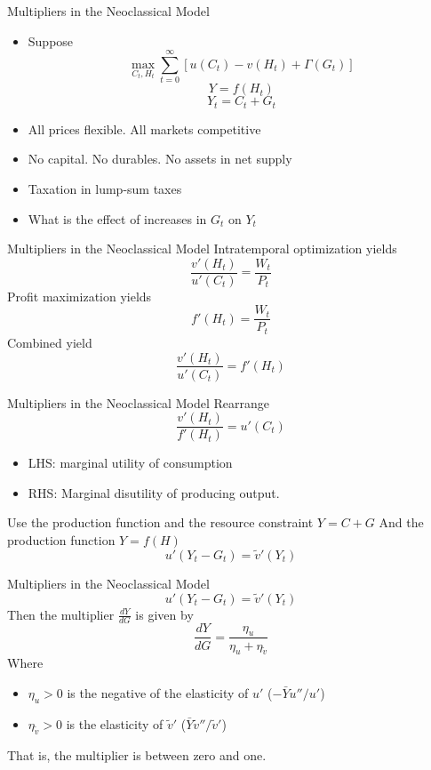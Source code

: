 \documentclass[english,xcolor=svgnames]{beamer}
\begin{document}
\begin{frame}{Multipliers in the Neoclassical Model}
\begin{itemize}
\item Suppose
$$\max_{C_t,H_t} \sum_{t=0}^{\infty} \left[u(C_t) - v(H_t) + \Gamma(G_t)\right]$$
\vspace{-0.5cm}
$$Y = f(H_t)$$
\vspace{-0.5cm}
$$Y_t = C_t + G_t$$
\vspace{-0.5cm}
\item All prices flexible. All markets competitive
\item No capital. No durables. No assets in net supply
\item Taxation in lump-sum taxes
\item What is the effect of increases in $G_t$ on $Y_t$
\end{itemize}
\end{frame}



\begin{frame}{Multipliers in the Neoclassical Model}
Intratemporal optimization yields
$$\frac{v'(H_t)}{u'(C_t)} = \frac{W_t}{P_t}$$
Profit maximization yields
$$f'(H_t) = \frac{W_t}{P_t}$$
Combined yield
$$\frac{v'(H_t)}{u'(C_t)}  = f'(H_t)$$
\end{frame}


\begin{frame}{Multipliers in the Neoclassical Model}
Rearrange
$$\frac{v'(H_t)}{ f'(H_t)}  = u'(C_t)$$
\begin{itemize}
\item LHS: marginal utility of consumption
\item RHS: Marginal disutility of producing output.
\end{itemize}
\vspace{1cm}
Use the production function and the resource constraint $Y = C + G$ And the production function $Y = f(H)$
$$ u'(Y_t - G_t) = \tilde{v}'(Y_t) $$
\end{frame}


\begin{frame}{Multipliers in the Neoclassical Model}
$$ u'(Y_t - G_t) = \tilde{v}'(Y_t) $$
Then the multiplier $\frac{dY}{dG}$ is given by
$$\frac{dY}{dG} = \frac{\eta_u}{\eta_u + \eta_{\tilde{v}}}$$
Where
\begin{itemize}
\item $\eta_u > 0$ is the negative of the elasticity of $u'$ ($-\bar{Y}u''/u'$)
\item $\eta_{\tilde{v}} > 0$ is the elasticity of $\tilde{v}'$ ($\bar{Y}\tilde{v}''/\tilde{v}'$)
\end{itemize}
That is, the multiplier is between zero and one.
\end{frame}
\end{document}
